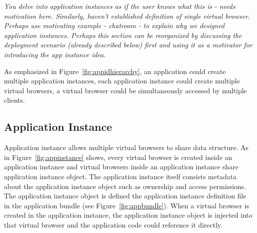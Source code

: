 \apphierarchyfig{}

\emph{You delve into application instances as if the user knows what this
    is - needs motivation here.  Similarly, haven't established definition
    of single virtual browser.
    Perhaps use motivating example - chatroom - to explain why we designed
    application instances.
    Perhaps this section can be reorganized by discussing the deployment
    scenario (already described below) first and using it as a motivator for 
    introducing the app instance idea.}

As emphasized in Figure~\ref{fig:appidhierarchy},
an application could create multiple application instances,
each application instance could create multiple virtual browsers,
a virtual browser could be simultaneously accessed by multiple clients.


\subsection{Application Instance}
\label{sec:appins}
\appinstancefig{}


Application instance allows multiple virtual browsers to share data structure.
As in Figure~\ref{fig:appinstance} shows, 
every virtual browser is created inside an application instance
and virtual browsers inside an application instance share application instance object.
The application instance itself
consists metadata about the application instance object
 such as ownership and access permissions.
The application instance object is defined
the application instance definition file 
in the application bundle (see Figure~\ref{fig:appbundle}).
When a virtual browser is created in the application instance,
the application instance object is injected into that virtual browser
and the application code could reference it directly.

